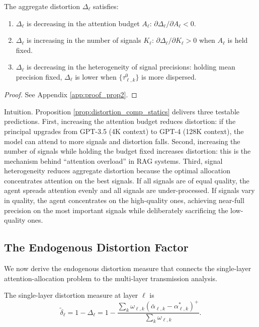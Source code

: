 \begin{proposition}\label{prop:distortion_comp_statics}
The aggregate distortion $\Delta_\ell$ satisfies:
\begin{enumerate}[label=(\roman*)]
\item $\Delta_\ell$ is decreasing in the attention budget $A_\ell$: $\partial \Delta_\ell / \partial A_\ell < 0$.
\item $\Delta_\ell$ is increasing in the number of signals $K_\ell$: $\partial \Delta_\ell / \partial K_\ell > 0$ when $A_\ell$ is held fixed.
\item $\Delta_\ell$ is decreasing in the heterogeneity of signal precisions: holding mean precision fixed, $\Delta_\ell$ is lower when $\{\tau^0_{\ell,k}\}$ is more dispersed.
\end{enumerate}
\end{proposition}

\begin{proof}
See Appendix \ref{app:proof_prop2}.
\end{proof}

Intuition. Proposition \ref{prop:distortion_comp_statics} delivers three testable predictions. First, increasing the attention budget reduces distortion: if the principal upgrades from GPT-3.5 (4K context) to GPT-4 (128K context), the model can attend to more signals and distortion falls. Second, increasing the number of signals while holding the budget fixed increases distortion: this is the mechanism behind ``attention overload'' in RAG systems. Third, signal heterogeneity reduces aggregate distortion because the optimal allocation concentrates attention on the best signals. If all signals are of equal quality, the agent spreads attention evenly and all signals are under-processed. If signals vary in quality, the agent concentrates on the high-quality ones, achieving near-full precision on the most important signals while deliberately sacrificing the low-quality ones.

\subsection{The Endogenous Distortion Factor}
\label{subsec:endogenous_distortion}

We now derive the endogenous distortion measure that connects the single-layer attention-allocation problem to the multi-layer transmission analysis.

\begin{definition}\label{def:single_layer_distortion}
The single-layer distortion measure at layer $\ell$ is
\begin{equation}\label{eq:single_distortion}
\tilde{\delta}_\ell = 1 - \Delta_\ell = 1 - \frac{\sum_k \omega_{\ell,k} (\bar{\alpha}_{\ell,k} - \alpha^*_{\ell,k})^+}{\sum_k \omega_{\ell,k}}.
\end{equation}
\end{definition}


